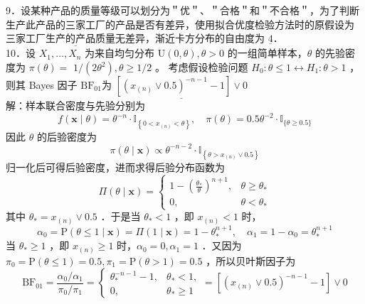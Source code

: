\documentclass[UTF8,openany]{book}
\begin{document}
	9．设某种产品的质量等级可以划分为＂优＂、＂合格＂和＂不合格＂，为了判断生产此产品的三家工厂的产品是否有差异，使用拟合优度检验方法时的原假设为 $\underline{\text{三家工厂生产的产品质量无差异}} $，渐近卡方分布的自由度为 $\underline{4}$．\\
	10．设 $X_1, \ldots, X_n$ 为来自均匀分布 $\mathrm{U}(0, \theta), \theta>0$ 的一组简单样本，$\theta$ 的先验密度为 $\pi(\theta)=$ $1 /\left(2 \theta^2\right), \theta \geq 1 / 2$ 。 考虑假设检验问题 $H_0: \theta \leq 1 \leftrightarrow H_1: \theta>1$ ，则其 Bayes 因子 $\mathrm{BF}_{01}$为 $\underline{\left[\left(x_{(n)} \vee 0.5\right)^{-n-1}-1\right] \vee 0}$ \\
	解：样本联合密度与先验分别为
	$$
	f(\boldsymbol{x} \mid \theta)=\theta^{-n} \cdot \mathbb{I}_{\left\{0<x_{(n)}<\theta\right\}}, \quad \pi(\theta)=0.5 \theta^{-2} \cdot \mathbb{I}_{\{\theta \geq 0.5\}}
	$$
	因此 $\theta$ 的后验密度为
	$$
	\pi(\theta \mid \boldsymbol{x}) \propto \theta^{-n-2} \cdot \mathbb{I}_{\left\{\theta>x_{(n)} \vee 0.5\right\}}
	$$
	归一化后可得后验密度，进而求得后验分布函数为
	$$
	\Pi(\theta \mid \boldsymbol{x})= \begin{cases}1-\left(\frac{\theta_*}{\theta}\right)^{n+1}, & \theta \geq \theta_* \\ 0, & \theta<\theta_*\end{cases}
	$$
	其中 $\theta_*=x_{(n)} \vee 0.5$ ．于是当 $\theta_*<1$ ，即 $x_{(n)}<1$ 时，
	$$
	\alpha_0=\mathrm{P}(\theta \leq 1 \mid \boldsymbol{x})=\Pi(1 \mid \boldsymbol{x})=1-\theta_*^{n+1}, \quad \alpha_1=1-\alpha_0=\theta_*^{n+1}
	$$
	当 $\theta_* \geq 1$ ，即 $x_{(n)} \geq 1$ 时，$\alpha_0=0, \alpha_1=1$ ．又因为 $\pi_0=\mathrm{P}(\theta \leq 1)=0.5, \pi_1=\mathrm{P}(\theta>1)=0.5$ ，所以贝叶斯因子为
	$$
	\mathrm{BF}_{01}=\frac{\alpha_0 / \alpha_1}{\pi_0 / \pi_1}=\left\{\begin{array}{ll}
		\theta_*^{-n-1}-1, & \theta_*<1, \\
		0, & \theta_* \geq 1
	\end{array}=\left[\left(x_{(n)} \vee 0.5\right)^{-n-1}-1\right] \vee 0\right.
	$$\\
	
	
	
\end{document}
